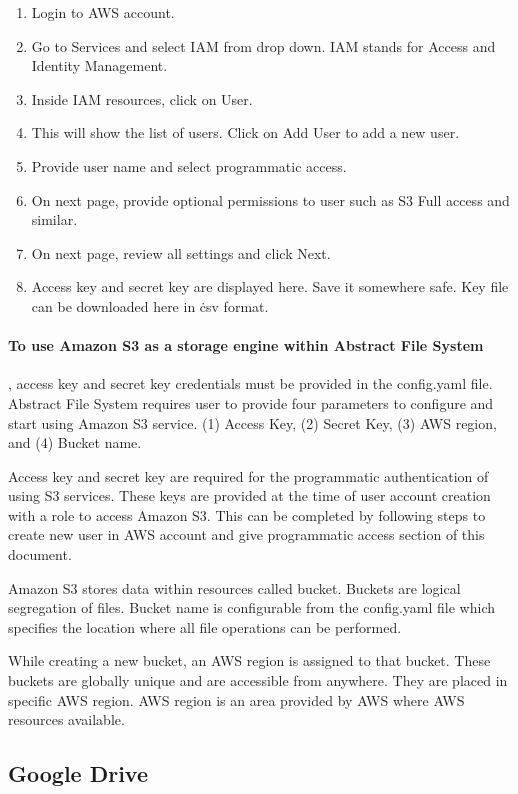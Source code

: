 \begin{enumerate}
    \item Login to AWS account.
    \item Go to Services and select IAM from drop down. 
	IAM stands for Access and Identity Management.
    \item Inside IAM resources, click on User.
    \item This will show the list of users. Click on Add User to add a new 
user.
    \item Provide user name and select programmatic access.
    \item On next page, provide optional permissions to user such as S3 Full
access and similar.
    \item On next page, review all settings and click Next.
    \item Access key and secret key are displayed here. Save it somewhere safe.
Key file can be downloaded here in \.csv format.
\end{enumerate}



\paragraph{To use Amazon S3 as a storage engine within Abstract File System}, 
access key and secret key credentials must be provided 
in the config.yaml file. Abstract File System requires user to 
provide four parameters to configure and start using Amazon S3 service.
(1) Access Key, 
(2) Secret Key,
(3) AWS region, and
(4) Bucket name.


Access key and secret key are required for the programmatic authentication of 
using S3 services. These keys are provided at the time of 
user account creation with a role to access Amazon S3.
This can be completed by following steps to create new user 
in AWS account and give programmatic access section of this document.

Amazon S3 stores data within resources called bucket. Buckets are logical
segregation of files. Bucket name is configurable from the config.yaml file
which specifies the location where all file operations can be performed.

While creating a new bucket, an AWS region is assigned to that bucket. These 
buckets are globally unique and are accessible from anywhere. They are
placed in specific AWS region. AWS region is an area provided by AWS where
AWS resources available.

\subsection{Google Drive}

